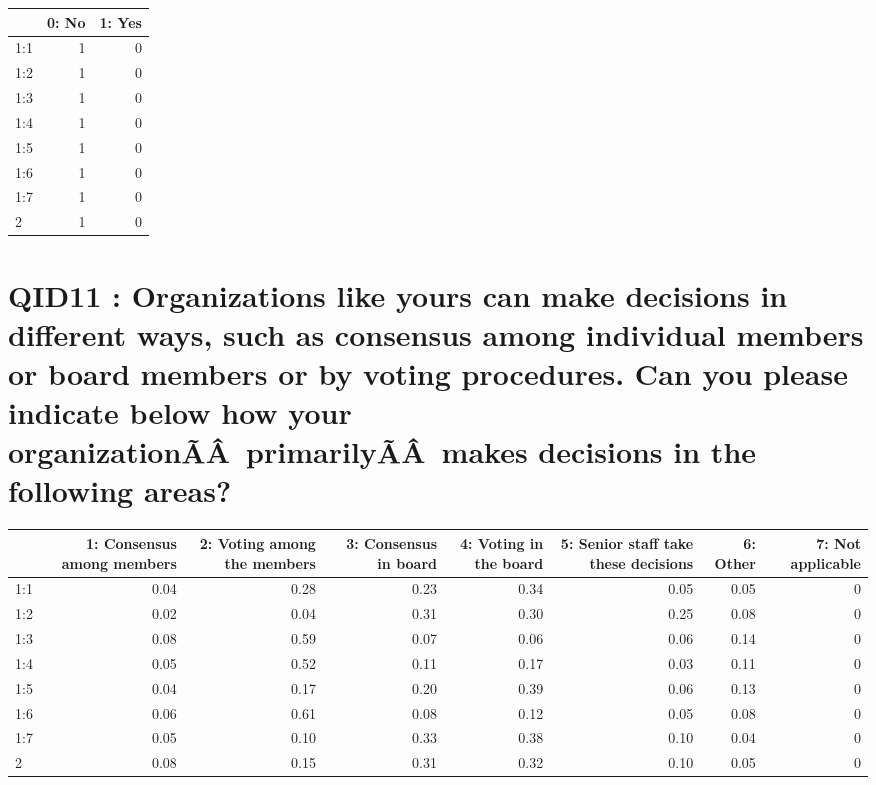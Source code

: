 \documentclass[]{article}
\begin{document}
\begin{table}[H]
\centering\begingroup\fontsize{30}{32}\selectfont

\begin{tabular}{l|r|r}
\hline
  & 0: No &  1: Yes\\
\hline
1:1 & 1 & 0\\
\hline
1:2 & 1 & 0\\
\hline
1:3 & 1 & 0\\
\hline
1:4 & 1 & 0\\
\hline
1:5 & 1 & 0\\
\hline
1:6 & 1 & 0\\
\hline
1:7 & 1 & 0\\
\hline
2 & 1 & 0\\
\hline
\end{tabular}
\endgroup{}
\end{table}

\section{QID11 : Organizations like yours can make decisions in
different ways, such as consensus among individual members or board
members or by voting procedures. Can you please indicate below how your
organizationÃÂ~primarilyÃÂ~makes decisions in the following
areas?}\label{qid11-organizations-like-yours-can-make-decisions-in-different-ways-such-as-consensus-among-individual-members-or-board-members-or-by-voting-procedures.-can-you-please-indicate-below-how-your-organizationaaprimarilyaamakes-decisions-in-the-following-areas}

\begin{table}[H]
\centering\begingroup\fontsize{30}{32}\selectfont

\begin{tabular}{l|r|r|r|r|r|r|r}
\hline
  & 1: Consensus among members &  2: Voting among the members &  3: Consensus in board &  4: Voting in the board &  5: Senior staff take these decisions &  6: Other &  7: Not applicable\\
\hline
1:1 & 0.04 & 0.28 & 0.23 & 0.34 & 0.05 & 0.05 & 0\\
\hline
1:2 & 0.02 & 0.04 & 0.31 & 0.30 & 0.25 & 0.08 & 0\\
\hline
1:3 & 0.08 & 0.59 & 0.07 & 0.06 & 0.06 & 0.14 & 0\\
\hline
1:4 & 0.05 & 0.52 & 0.11 & 0.17 & 0.03 & 0.11 & 0\\
\hline
1:5 & 0.04 & 0.17 & 0.20 & 0.39 & 0.06 & 0.13 & 0\\
\hline
1:6 & 0.06 & 0.61 & 0.08 & 0.12 & 0.05 & 0.08 & 0\\
\hline
1:7 & 0.05 & 0.10 & 0.33 & 0.38 & 0.10 & 0.04 & 0\\
\hline
2 & 0.08 & 0.15 & 0.31 & 0.32 & 0.10 & 0.05 & 0\\
\hline
\end{tabular}
\endgroup{}
\end{table}
\end{document}
